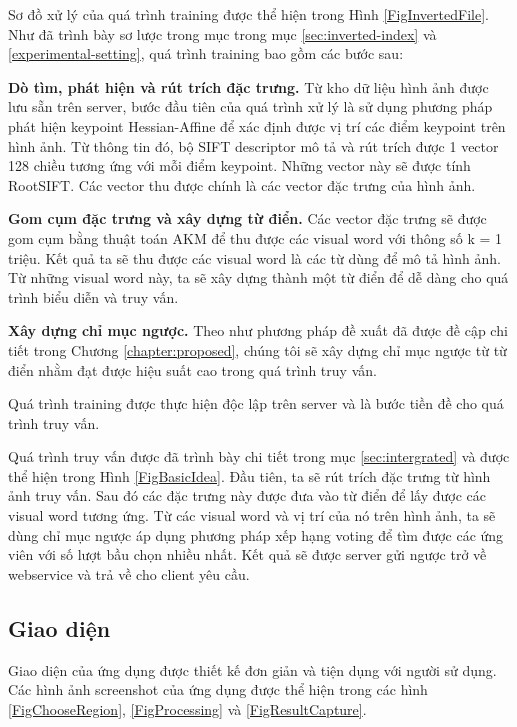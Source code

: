 Sơ đồ xử lý của quá trình training được thể hiện trong Hình \ref{FigInvertedFile}. Như đã trình bày sơ lược trong mục trong mục \ref{sec:inverted-index} và \ref{experimental-setting}, quá trình training bao gồm các bước sau:

\textbf{Dò tìm, phát hiện và rút trích đặc trưng.} Từ kho dữ liệu hình ảnh được lưu sẵn trên server, bước đầu tiên của quá trình xử lý là sử dụng phương pháp phát hiện keypoint Hessian-Affine để xác định được vị trí các điểm keypoint trên hình ảnh. Từ thông tin đó, bộ SIFT descriptor mô tả và rút trích được 1 vector 128 chiều tương ứng với mỗi điểm keypoint. Những vector này sẽ được tính RootSIFT. Các vector thu được chính là các vector đặc trưng của hình ảnh. 

\textbf{Gom cụm đặc trưng và xây dựng từ điển.} Các vector đặc trưng sẽ được gom cụm bằng thuật toán AKM để thu được các visual word với thông số k = 1 triệu. Kết quả ta sẽ thu được các visual word là các từ dùng để mô tả hình ảnh. Từ những visual word này, ta sẽ xây dựng thành một từ điển để dễ dàng cho quá trình biểu diễn và truy vấn.

\textbf{Xây dựng chỉ mục ngược.} Theo như phương pháp đề xuất đã được đề cập chi tiết trong Chương \ref{chapter:proposed}, chúng tôi sẽ xây dựng chỉ mục ngược từ từ điển nhằm đạt được hiệu suất cao trong quá trình truy vấn.

Quá trình training được thực hiện độc lập trên server và là bước tiền đề cho quá trình truy vấn.

Quá trình truy vấn được đã trình bày chi tiết trong mục \ref{sec:intergrated} và được thể hiện trong Hình \ref{FigBasicIdea}. Đầu tiên, ta sẽ rút trích đặc trưng từ hình ảnh truy vấn. Sau đó các đặc trưng này được đưa vào từ điển để lấy được các visual word tương ứng. Từ các visual word và vị trí của nó trên hình ảnh, ta sẽ dùng chỉ mục ngược áp dụng phương pháp xếp hạng voting để tìm được các ứng viên với số lượt bầu chọn nhiều nhất. Kết quả sẽ được server gửi ngược trở về webservice và trả về cho client yêu cầu.

\subsection{Giao diện}
Giao diện của ứng dụng được thiết kế đơn giản và tiện dụng với người sử dụng. Các hình ảnh screenshot của ứng dụng được thể hiện trong các hình \ref{FigChooseRegion}, \ref{FigProcessing} và \ref{FigResultCapture}.

